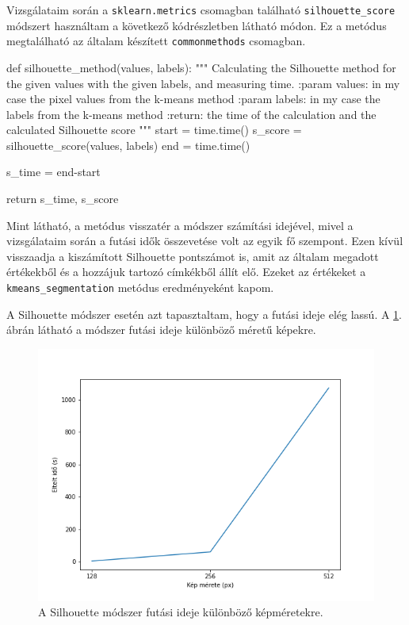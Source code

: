 Vizsgálataim során a \texttt{sklearn.metrics} csomagban található \texttt{silhouette\_score} módszert használtam a következő kódrészletben látható módon. Ez a metódus megtalálható az általam készített \texttt{commonmethods} csomagban.
\begin{python}
def silhouette_method(values, labels):
    """
    Calculating the Silhouette method for the given values with
    the given labels, and measuring time.
    :param values: in my case the pixel values from the k-means method
    :param labels: in my case the labels from the k-means method
    :return: the time of the calculation and
        the calculated Silhouette score
    """
    start = time.time()
    s_score = silhouette_score(values, labels)
    end = time.time()

    s_time = end-start

    return s_time, s_score
\end{python}
Mint látható, a metódus visszatér a módszer számítási idejével, mivel a vizsgálataim során a futási idők összevetése volt az egyik fő szempont. Ezen kívül visszaadja a kiszámított Silhouette pontszámot is, amit az általam megadott értékekből és a hozzájuk tartozó címkékből állít elő. Ezeket az értékeket a \texttt{kmeans\_segmentation} metódus eredményeként kapom.

A Silhouette módszer esetén azt tapasztaltam, hogy a futási ideje elég lassú. A \ref{fig:silhouette_runtime}. ábrán látható a módszer futási ideje különböző méretű képekre.

\begin{figure}[h]
\centering
\includegraphics[scale=0.7]{images/silhouette_runtime.png}
\caption{A Silhouette módszer futási ideje különböző képméretekre.}
\label{fig:silhouette_runtime}
\end{figure}

